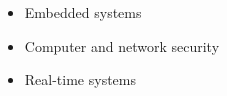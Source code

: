 \begin{itemize}
    \item Embedded systems
    \item Computer and network security
    \item Real-time systems
\end{itemize}
